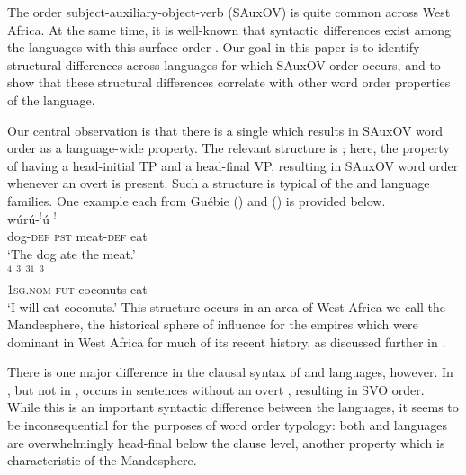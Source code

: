 \documentclass[output=paper]{LSP/langsci}
\begin{document}
The order subject-auxiliary-object-verb (SAuxOV) is quite common across West Africa. At the same time, it is well-known that syntactic differences exist among the languages with this surface order \citep{Creissels2005typology}. Our goal in this paper is to identify structural differences across languages for which SAuxOV order occurs, and to show that these structural differences correlate with other word order properties of the language.

Our central observation is that there is a single  which results in SAuxOV word order as a language-wide property. The relevant structure is ; here, the property of having a head-initial TP and a head-final VP, resulting in SAuxOV word order whenever an overt  is present. Such a structure is typical of the  and  language families. One example each from Gu\'ebie () and  () is provided below.
\ea 
\label{ex:1:sauxov}
\ea {} \\ 
\gll w\'ur\'u-$^!$\'u {$^!$}  {}  \\
{dog}-\textsc{def} \textsc{pst} meat-\textsc{def} eat\\
\glt `The dog ate the meat.'  \label{ex:1b:sauxov}
\ex {} \\ 
\gll {}$^{4}$ $^{3}$ $^{31}$ $^{3}$\\
\textsc{1sg}.\textsc{nom} \textsc{fut} coconuts eat \\
\glt `I will eat coconuts.'  \label{ex:1a:sauxov}
\z
\z
This structure occurs in an area of West Africa we call the Mandesphere, the historical sphere of influence for the  empires which were dominant in West Africa for much of its recent history, as discussed further in .

There is one major difference in the clausal syntax of  and  languages, however. In , but not in ,  occurs in sentences without an overt , resulting in SVO order. While this is an important syntactic difference between the languages, it seems to be inconsequential for the purposes of word order typology: both  and  languages are overwhelmingly head-final below the clause level, another property which is characteristic of the Mandesphere.
\end{document}

